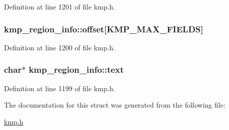 Definition at line 1201 of file kmp.\-h.

\hypertarget{structkmp__region__info_a96bdcd59666e72a9f364182fb92817b4}{
\subsubsection[{offset}]{ kmp\-\_\-region\-\_\-info\-::offset\mbox{[}{\bf K\-M\-P\-\_\-\-M\-A\-X\-\_\-\-F\-I\-E\-L\-D\-S}\mbox{]}}}\label{structkmp__region__info_a96bdcd59666e72a9f364182fb92817b4}


Definition at line 1200 of file kmp.\-h.

\hypertarget{structkmp__region__info_a3b54581bfc8441186a8247bc62402621}{
\subsubsection[{text}]{\setlength{\rightskip}{0pt plus 5cm}char$\ast$ kmp\-\_\-region\-\_\-info\-::text}}\label{structkmp__region__info_a3b54581bfc8441186a8247bc62402621}


Definition at line 1199 of file kmp.\-h.



The documentation for this struct was generated from the following file\-:\begin{DoxyCompactItemize}
\item 
\hyperlink{kmp_8h}{kmp.\-h}\end{DoxyCompactItemize}
